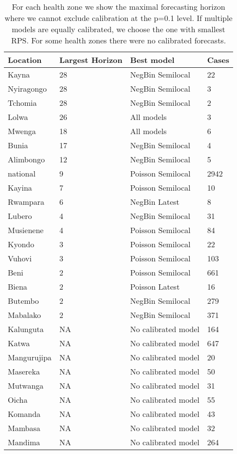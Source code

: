 \begin{table}[h!]
\centering
\begin{tabular}{|l|l|l|l|}
  \hline
Location & Largest Horizon & Best model & Cases \\ 
  \hline
Kayna & 28 & NegBin Semilocal & 22 \\ 
  Nyiragongo & 28 & NegBin Semilocal & 3 \\ 
  Tchomia & 28 & NegBin Semilocal & 2 \\ 
  Lolwa & 26 & All models & 3 \\ 
  Mwenga & 18 & All models & 6 \\ 
  Bunia & 17 & NegBin Semilocal & 4 \\ 
  Alimbongo & 12 & NegBin Semilocal & 5 \\ 
  national & 9 & Poisson Semilocal & 2942 \\ 
  Kayina & 7 & Poisson Semilocal & 10 \\ 
  Rwampara & 6 & NegBin Latest & 8 \\ 
  Lubero & 4 & NegBin Semilocal & 31 \\ 
  Musienene & 4 & Poisson Semilocal & 84 \\ 
  Kyondo & 3 & Poisson Semilocal & 22 \\ 
  Vuhovi & 3 & Poisson Semilocal & 103 \\ 
  Beni & 2 & Poisson Semilocal & 661 \\ 
  Biena & 2 & Poisson Latest & 16 \\ 
  Butembo & 2 & NegBin Semilocal & 279 \\ 
  Mabalako & 2 & NegBin Semilocal & 371 \\ 
  Kalunguta & NA & No calibrated model & 164 \\ 
  Katwa & NA & No calibrated model & 647 \\ 
  Mangurujipa & NA & No calibrated model & 20 \\ 
  Masereka & NA & No calibrated model & 50 \\ 
  Mutwanga & NA & No calibrated model & 31 \\ 
  Oicha & NA & No calibrated model & 55 \\ 
  Komanda & NA & No calibrated model & 43 \\ 
  Mambasa & NA & No calibrated model & 32 \\ 
  Mandima & NA & No calibrated model & 264 \\ 
   \hline
\end{tabular}
\caption{For each health zone we show the maximal forecasting horizon where we cannot exclude calibration at the p=0.1 level. If multiple models are equally calibrated, we choose the one with smallest RPS. For some health zones there were no calibrated forecasts.} 
\label{tab:best_model}
\end{table}
